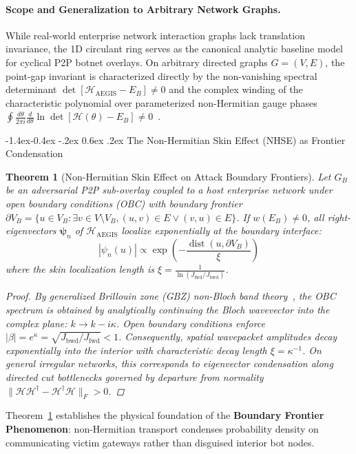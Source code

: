 \documentclass[10pt,twocolumn,letterpaper]{article}
\makeatletter
\renewcommand\subsection{\@startsection{subsection}{2}{\z@}%
                                     {-1.4ex\@plus -0.4ex \@minus -.2ex}%
                                     {0.6ex \@plus .2ex}%
                                     {\normalfont\normalsize\bfseries}}
\newtheorem{theorem}{Theorem}
\makeatother
\begin{document}
\paragraph{Scope and Generalization to Arbitrary Network Graphs.}
While real-world enterprise network interaction graphs lack translation invariance, the 1D circulant ring serves as the canonical analytic baseline model for cyclical P2P botnet overlays. On arbitrary directed graphs $G=(V, E)$, the point-gap invariant is characterized directly by the non-vanishing spectral determinant $\det[\mathcal{H}_{\text{AEGIS}} - E_B] \ne 0$ and the complex winding of the characteristic polynomial over parameterized non-Hermitian gauge phases $\oint \frac{d\theta}{2\pi i} \frac{d}{d\theta} \ln \det[\mathcal{H}(\theta) - E_B] \ne 0$~\cite{kawabata2019symmetry, okuma2020topological}.

\subsection{The Non-Hermitian Skin Effect (NHSE) as Frontier Condensation}

\begin{theorem}[Non-Hermitian Skin Effect on Attack Boundary Frontiers]
\label{thm:nhse}
Let $G_B$ be an adversarial P2P sub-overlay coupled to a host enterprise network under open boundary conditions (OBC) with boundary frontier $\partial V_B = \{u \in V_B : \exists v \in V \setminus V_B, (u, v) \in E \lor (v, u) \in E\}$. If $w(E_B) \ne 0$, all right-eigenvectors $\boldsymbol{\psi}_n$ of $\mathcal{H}_{\text{AEGIS}}$ localize exponentially at the boundary interface:
\begin{equation}
|\psi_n(u)| \propto \exp\left(-\frac{\operatorname{dist}(u, \partial V_B)}{\xi}\right)
\end{equation}
where the skin localization length is $\xi = \frac{1}{\ln(J_{\text{fwd}} / J_{\text{bwd}})}$.
\begin{proof}
By generalized Brillouin zone (GBZ) non-Bloch band theory~\cite{yao2018edge, kawabata2019symmetry}, the OBC spectrum is obtained by analytically continuing the Bloch wavevector into the complex plane: $k \to k - i \kappa$. Open boundary conditions enforce $|\beta| = e^\kappa = \sqrt{J_{\text{bwd}} / J_{\text{fwd}}} < 1$. Consequently, spatial wavepacket amplitudes decay exponentially into the interior with characteristic decay length $\xi = \kappa^{-1}$. On general irregular networks, this corresponds to eigenvector condensation along directed cut bottlenecks governed by departure from normality $\|\mathcal{H} \mathcal{H}^\dagger - \mathcal{H}^\dagger \mathcal{H}\|_F > 0$.
\end{proof}
\end{theorem}
Theorem~\ref{thm:nhse} establishes the physical foundation of the \textbf{Boundary Frontier Phenomenon}: non-Hermitian transport condenses probability density on communicating victim gateways rather than disguised interior bot nodes.
\end{document}
